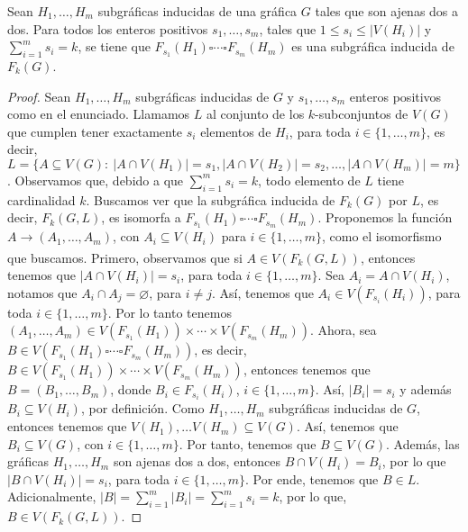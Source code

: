 \begin{teorema}
    \label{teo:PCartes}
    Sean $H_1, \dots, H_m$ subgr\'aficas inducidas de una gr\'afica $G$ tales
    que son ajenas dos a dos. Para todos los enteros positivos $s_1, \dots,
    s_m$, tales que $1 \leq s_i \leq |V(H_i)|$ y $\sum\limits_{i=1}^{m}  s_i =
    k$, se tiene que $F_{s_1}(H_1) \square \cdots \square F_{s_m}(H_m)$ es una
    subgr\'afica inducida de $F_k(G)$.
\end{teorema}

\begin{proof}
    Sean $H_1, \dots, H_m$ subgr\'aficas inducidas de  $G$ y $s_1, \dots, s_m$
    enteros positivos como en el enunciado. Llamamos $L$ al conjunto de los
    $k$-subconjuntos de $V(G)$ que cumplen tener exactamente $s_i$ elementos de
    $H_i$, para toda $i \in \{1, \dots, m\}$, es decir, $L = \{A \subseteq V(G)
    \colon\ |A\cap V(H_1)|=s_1 , |A \cap V(H_2)|=s_2, \dots, |A \cap V(H_m)|=m
    \}$. Observamos que, debido a  que $\sum\limits_{i=1}^{m} s_i = k$, todo
    elemento de $L$ tiene cardinalidad $k$. Buscamos ver que la subgr\'afica
    inducida de $F_k(G)$ por $L$, es decir, $F_k(G,L)$, es isomorfa a
    $F_{s_1}(H_1) \square \cdots \square F_{s_m}(H_m)$. Proponemos la funci\'on
    $A \xrightarrow[]{}(A_1, \dots, A_m)$, con $A_i \subseteq V(H_i)$ para $i
    \in \{1, \dots, m\}$, como el isomorfismo que buscamos. Primero, observamos
    que si $A \in V(F_k(G,L))$, entonces tenemos que $|A \cap V(H_i)|=s_i$, para
    toda $i \in \{1, \dots, m\}$. Sea $A_i = A \cap V(H_i)$, notamos que $A_i
    \cap A_j = \varnothing$, para $i \neq j$. As\'i, tenemos que $A_i \in
    V(F_{s_i}(H_i))$, para toda $i \in \{1, \dots, m\}$. Por lo tanto tenemos
    $(A_1, \dots, A_m) \in V(F_{s_1}(H_1)) \times \cdots \times
    V(F_{s_m}(H_m))$. Ahora, sea $B \in V(F_{s_1}(H_1) \square \cdots \square
    F_{s_m}(H_m))$, es decir, $B \in V(F_{s_1}(H_1)) \times \cdots \times
    V(F_{s_m}(H_m))$, entonces tenemos que $B= (B_1, \dots, B_m)$, donde $B_i
    \in F_{s_i}(H_i)$, $i \in \{1, \dots, m\}$. As\'i, $|B_i|= s_i$ y adem\'as
    $B_i \subseteq V(H_i)$, por definici\'on. Como $H_1 ,\dots, H_m$
    subgr\'aficas inducidas de $G$, entonces tenemos que $V(H_1), \dots V(H_m)
    \subseteq V(G)$. As\'i, tenemos que $B_i \subseteq V(G)$, con $i \in \{1,
    \dots, m\}$. Por tanto, tenemos que $B \subseteq V(G)$. Adem\'as, las
    gr\'aficas $H_1, \dots, H_m$ son ajenas dos a dos, entonces $B \cap V(H_i)=
    B_i$, por lo que $|B \cap V(H_i)|=s_i$, para toda $i \in \{1, \dots, m\}$.
    Por ende, tenemos que $B \in L$. Adicionalmente, $|B| =
    \sum\limits_{i=1}^{m} |B_i| =\sum\limits_{i=1}^{m} s_i = k$, por lo que, $B
    \in V(F_k(G,L))$.


\end{proof}
